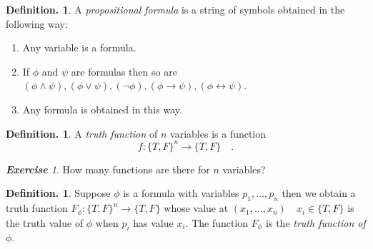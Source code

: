 \documentclass[a4paper,oneside,11pt,DIV=12,parskip=half]{scrartcl}
\theoremstyle{plain}
\theoremstyle{definition}
\newtheorem{definition}[theorem]{Definition.}
\newtheorem{remark, definition}[theorem]{Remark and Definition.}
\newtheorem{lemma, definition}[theorem]{Lemma and Definition.}
\newtheorem{theorem, definition}[theorem]{Theorem and Definition.}
\theoremstyle{remark}
\newtheorem*{exercise}{\textbf{Exercise}}
\newtheorem*{remark, example}{\textbf{Remark and Exercise}}
\begin{document}
\begin{definition}\label{Def:formula}
	A \emph{propositional formula} is a string of symbols obtained in the following way:
\begin{enumerate}
\item Any variable is a formula.
\item If $\phi $ and $\psi$ are formulas then so are
$(\phi \land \psi),(\phi \lor \psi), (\lnot \phi), (\phi \rightarrow \psi), (\phi \leftrightarrow \psi)$.
\item Any formula is obtained in this way.
\end{enumerate}
\end{definition}

\begin{definition}
A \emph{truth function} of $n$ variables is a function 
	\[ f: \{ T,F \}^n \rightarrow \{ T,F \} \quad. \]
\end{definition}

\begin{exercise} 
How many functions are there for $n$ variables?

\end{exercise}

\begin{definition}
Suppose $\phi$ is a formula with variables $p_1, \dots, p_n$ then we obtain a truth function $F_{\phi}: \{T,F\}^n \rightarrow \{T,F\}$ whose value at $(x_1, \dots, x_n) \quad x_i \in \{T,F\} $ is the truth value of $\phi$ when $p_i$ has value $x_i$. The function $F_{\phi}$ is the \emph{truth function of $\phi$}.
\end{definition}
\end{document}
